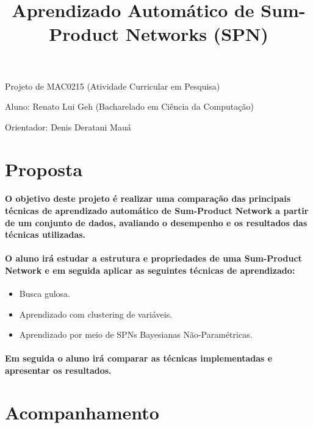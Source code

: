\documentclass[a4paper,10pt]{article}
\title{\textbf{Aprendizado Automático de Sum-Product Networks (SPN)}}
\theoremstyle{plain}
\begin{document}
\date{}
\author{}
\vspace*{-40pt}
{\let\newpage\relax\maketitle}

Projeto de MAC0215 (Atividade Curricular em Pesquisa)

Aluno: Renato Lui Geh (Bacharelado em Ciência da Computação)

Orientador: Denis Deratani Mauá

\section{Proposta}

\paragraph{
  O objetivo deste projeto é realizar uma comparação das principais técnicas de aprendizado 
automático de Sum-Product Network a partir de um conjunto de dados, avaliando o desempenho 
e os resultados das técnicas utilizadas.
}

\paragraph{
  O aluno irá estudar a estrutura e propriedades de uma Sum-Product Network e em seguida
aplicar as seguintes técnicas de aprendizado:
}

\begin{itemize} \itemsep0pt
  \item Busca gulosa.\cite{greedy-search}
  \item Aprendizado com clustering de variáveis.\cite{clustering}
  \item Aprendizado por meio de SPNs Bayesianas Não-Paramétricas.\cite{non-parametric-bayesian}
\end{itemize}

\paragraph{
  Em seguida o aluno irá comparar as técnicas implementadas e apresentar os resultados.
}

\section{Acompanhamento}
\end{document}
